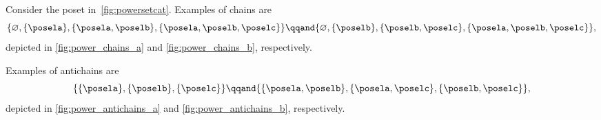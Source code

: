 \begin{example}
    Consider the poset in~\cref{fig:powersetcat}.
    Examples of chains are
    \begin{equation}
        \{\varnothing,\{\posela\},\{\posela,\poselb\},\{\posela,\poselb,\poselc\}\}
        \qqand
        \{\varnothing,\{\poselb\},\{\poselb,\poselc\},\{\posela,\poselb,\poselc\}\},
    \end{equation}
    depicted in \cref{fig:power_chains_a} and \cref{fig:power_chains_b}, respectively.

    Examples of antichains are
    \begin{equation}
        \{\{\posela\},\{\poselb\},\{\poselc\}\}
        \qqand
        \{ \{\posela,\poselb\},\{\posela,\poselc\}, \{\poselb,\poselc\}\},
    \end{equation}
    depicted in \cref{fig:power_antichains_a} and \cref{fig:power_antichains_b}, respectively.

\end{example}

\begin{figure*}
\end{figure*}

\clearpage

